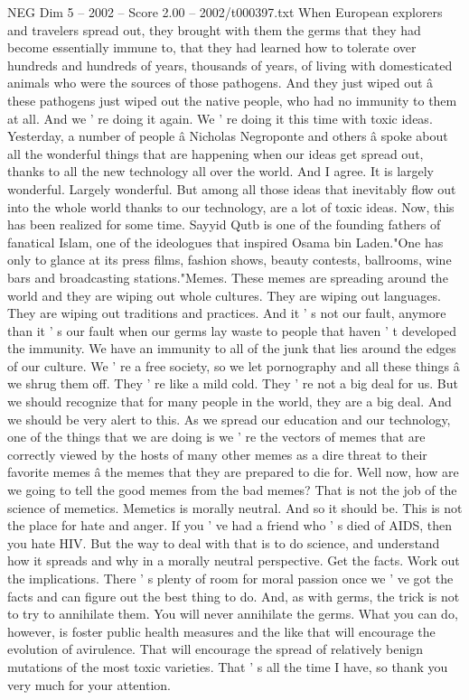 \begin{textsample}{NEG Dim 5 – 2002 – Score 2.00 – 2002/t000397.txt}
When European explorers and travelers spread out, they brought with them the germs that they had become essentially immune to, that they had learned how to tolerate over hundreds and hundreds of years, thousands of years, of living with domesticated animals who were the sources of those pathogens.
And they just wiped out â these pathogens just wiped out the native people, who had no immunity to them at all.
And we ' re doing it again.
We ' re doing it this time with toxic ideas.
Yesterday, a number of people â Nicholas Negroponte and others â spoke about all the wonderful things that are happening when our ideas get spread out, thanks to all the new technology all over the world.
And I agree.
It is largely wonderful.
Largely wonderful.
But among all those ideas that inevitably flow out into the whole world thanks to our technology, are a lot of toxic ideas.
Now, this has been realized for some time.
Sayyid Qutb is one of the founding fathers of fanatical Islam, one of the ideologues that inspired Osama bin Laden."One has only to glance at its press films, fashion shows, beauty contests, ballrooms, wine bars and broadcasting stations."Memes.
These memes are spreading around the world and they are wiping out whole cultures.
They are wiping out languages.
They are wiping out traditions and practices.
And it ' s not our fault, anymore than it ' s our fault when our germs lay waste to people that haven ' t developed the immunity.
We have an immunity to all of the junk that lies around the edges of our culture.
We ' re a free society, so we let pornography and all these things â we shrug them off.
They ' re like a mild cold.
They ' re not a big deal for us.
But we should recognize that for many people in the world, they are a big deal.
And we should be very alert to this.
As we spread our education and our technology, one of the things that we are doing is we ' re the vectors of memes that are correctly viewed by the hosts of many other memes as a dire threat to their favorite memes â the memes that they are prepared to die for.
Well now, how are we going to tell the good memes from the bad memes?
That is not the job of the science of memetics.
Memetics is morally neutral.
And so it should be.
This is not the place for hate and anger.
If you ' ve had a friend who ' s died of AIDS, then you hate HIV.
But the way to deal with that is to do science, and understand how it spreads and why in a morally neutral perspective.
Get the facts.
Work out the implications.
There ' s plenty of room for moral passion once we ' ve got the facts and can figure out the best thing to do.
And, as with germs, the trick is not to try to annihilate them.
You will never annihilate the germs.
What you can do, however, is foster public health measures and the like that will encourage the evolution of avirulence.
That will encourage the spread of relatively benign mutations of the most toxic varieties.
That ' s all the time I have, so thank you very much for your attention.

\end{textsample}
